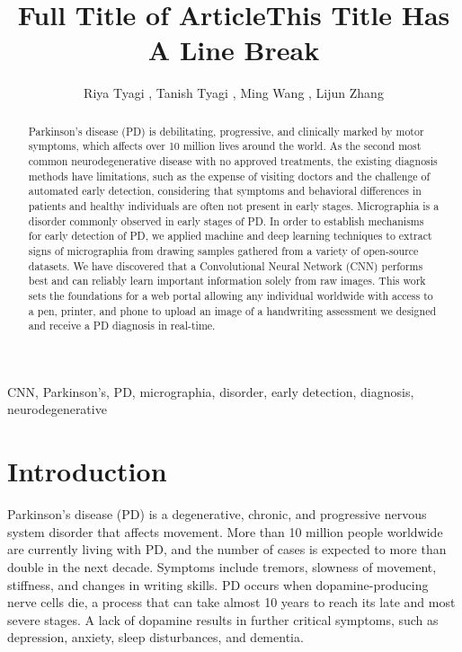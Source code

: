 \documentclass[pmlr,twocolumn,10pt]{jmlr} %
\title[Short Title]{Full Title of Article\titlebreak This Title Has
A Line Break}
\author{Riya Tyagi \nametag{\thanks{Authors contributed equally}\SUP{1}},
Tanish Tyagi \nametag{\footnotemark[1]\SUP{2}}, 
Ming Wang \SUP{3},
Lijun Zhang \SUP{4}
\centering \Email{
\\[\bigskipamount] 
\SUP{1}\{rtyagi\}
@exeter.edu}
\centering \Email{
\\[\bigskipamount] 
\SUP{2}\{ttyagi\}@mgh.harvard.edu}
\centering \Email{
\\[\bigskipamount] 
\SUP{3}\{mwang\}@phs.psu.edu}
\centering \Email{
\\[\bigskipamount] 
\SUP{4}\{lzhang6\}@pennstatehealth.psu.edu}
}
\begin{document}
\maketitle

\begin{abstract}
Parkinson’s disease (PD) is debilitating, progressive, and clinically marked by motor symptoms, which affects over 10 million lives around the world. As the second most common neurodegenerative disease with no approved treatments, the existing diagnosis methods have limitations, such as the expense of visiting doctors and the challenge of automated early detection, considering that symptoms and behavioral differences in patients and healthy individuals are often not present in early stages. Micrographia is a disorder commonly observed in early stages of PD. In order to establish mechanisms for early detection of PD, we applied machine and deep learning techniques to extract signs of micrographia from drawing samples gathered from a variety of open-source datasets. We have discovered that a Convolutional Neural Network (CNN) performs best and can reliably learn important information solely from raw images. This work sets the foundations for a web portal allowing any individual worldwide with access to a pen, printer, and phone to upload an image of a handwriting assessment we designed and receive a PD diagnosis in real-time.
\end{abstract}
\begin{keywords}
CNN, Parkinson’s, PD, micrographia, disorder, early detection, diagnosis, neurodegenerative
\end{keywords}

\section{Introduction}
\label{sec:intro}

Parkinson’s disease (PD) is a degenerative, chronic, and progressive nervous system disorder that affects movement. More than 10 million people worldwide are currently living with PD, and the number of cases is expected to more than double in the next decade. Symptoms include tremors, slowness of movement, stiffness, and changes in writing skills. PD occurs when dopamine-producing nerve cells die, a process that can take almost 10 years to reach its late and most severe stages. A lack of dopamine results in further critical symptoms, such as depression, anxiety, sleep disturbances, and dementia. 
\end{document}
